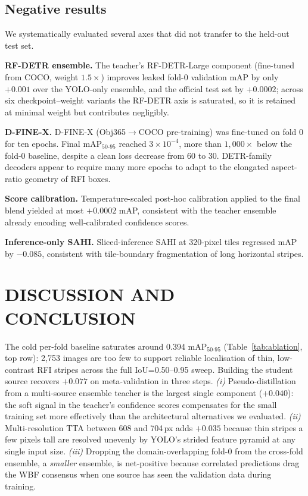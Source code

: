 \documentclass{article}
\begin{document}
\subsection{Negative results}

We systematically evaluated several axes that did not transfer to the
held-out test set.

\textbf{RF-DETR ensemble.} The teacher's RF-DETR-Large
\cite{roboflow2024rfdetr} component (fine-tuned from COCO, weight
$1.5\times$) improves leaked fold-0 validation mAP by only $+0.001$
over the YOLO-only ensemble, and the official test set by $+0.0002$;
across six checkpoint--weight variants the RF-DETR axis is saturated,
so it is retained at minimal weight but contributes negligibly.

\textbf{D-FINE-X.} D-FINE-X \cite{peng2024dfine}
(Obj365$\to$COCO pre-training) was fine-tuned on fold 0 for ten epochs.
Final mAP$_{50\text{-}95}$ reached $3{\times}10^{-4}$, more than
$1{,}000\times$ below the fold-0 baseline, despite a clean loss
decrease from 60 to 30. DETR-family decoders appear to require many
more epochs to adapt to the elongated aspect-ratio geometry of RFI
boxes.

\textbf{Score calibration.} Temperature-scaled post-hoc calibration
applied to the final blend yielded at most $+0.0002$ mAP, consistent
with the teacher ensemble already encoding well-calibrated confidence
scores.

\textbf{Inference-only SAHI.} Sliced-inference SAHI
\cite{akyon2022sahi} at 320-pixel tiles regressed mAP by $-0.085$,
consistent with tile-boundary fragmentation of long horizontal
stripes.

\section{DISCUSSION AND CONCLUSION}

The cold per-fold baseline saturates around 0.394
mAP$_{50\text{-}95}$ (Table~\ref{tab:ablation}, top row): 2{,}753
images are too few to support reliable localisation of thin,
low-contrast RFI stripes across the full IoU=0.50--0.95 sweep. Building
the student source recovers $+0.077$ on meta-validation in three steps.
\emph{(i)}
Pseudo-distillation from a multi-source ensemble teacher is the largest
single component ($+0.040$): the soft signal in the teacher's
confidence scores compensates for the small training set more
effectively than the architectural alternatives we evaluated.
\emph{(ii)}
Multi-resolution TTA between 608 and 704\,px adds $+0.035$
because thin stripes a few pixels tall are resolved unevenly by YOLO's
strided feature pyramid at any single input size. \emph{(iii)}
Dropping the domain-overlapping fold-0 from the cross-fold ensemble, a
\emph{smaller} ensemble, is net-positive because correlated predictions
drag the WBF consensus when one source has seen the validation data
during training.
\end{document}
